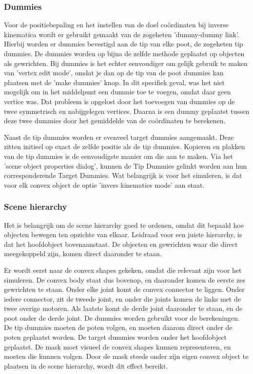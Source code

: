\documentclass[10pt,a4paper]{article}
\begin{document}
\subsubsection{Dummies}
Voor de positiebepaling en het instellen van de doel co\"ordinaten bij inverse kinematica wordt er gebruikt gemaakt van de zogeheten 'dummy-dummy link'. Hierbij worden er dummies bevestigd aan de tip van elke poot, de zogeheten tip dummies. De dummies worden op bijna de zelfde methode geplaatst op objecten als gewrichten. Bij dummies is het echter eenvoudiger om gelijk gebruik te maken van 'vertex edit mode', omdat je dan op de tip van de poot dummies kan plaatsen met de 'make dummies' knop. In dit specifiek geval, was het niet mogelijk om in het middelpunt een dummie toe te voegen, omdat daar geen vertice was. Dat probleem is opgelost door het toevoegen van dummies op de twee symmetrisch en nabijgelegen vertices. Daarna is een dummy geplaatst tussen deze twee dummies door het gemiddelde van de co\"ordinaten te berekenen.

Naast de tip dummies worden er evenveel target dummies aangemaakt. Deze zitten initieel op exact de zelfde positie als de tip dummies. Kopieren en plakken van de tip dummies is de eenvoudigste manier om die aan te maken. Via het 'scene object properties dialog', kunnen de Tip Dummies gelinkt worden aan hun corresponderende Target Dummies. Wat belangrijk is voor het simuleren, is dat voor elk convex object de optie 'invers kinematics mode' aan staat.

\subsubsection{Scene hierarchy}
Het is belangrijk om de scene hierarchy goed te ordenen, omdat dit bepaald hoe objecten bewegen ten opzichte van elkaar. Leidraad voor een juiste hierarchy, is dat het hoofdobject bovenaanstaat. De objecten en gewrichten waar die direct meegekoppeld zijn, komen direct daaronder te staan.


Er wordt eerst naar de convex shapes gekeken, omdat die relevant zijn voor het simuleren. De convex body staat dus bovenop, en daaronder komen de eerste zes gewrichten te staan. Onder elke joint komt de convex connector te liggen. Onder iedere connector, zit de tweede joint, en onder die joints komen de links met de twee overige motoren. Als laatste komt de derde joint daaronder te staan, en de poot onder de derde joint. De dummies worden gebruikt voor de berekeningen. De tip dummies moeten de poten volgen, en moeten daarom direct onder de poten geplaatst worden. De target dummies worden onder het hoofdobject geplaatst.
De mask moet visueel de convex shapes kunnen representeren, en moeten die kunnen volgen. Door de mask steeds onder zijn eigen convex object te plaatsen in de scene hierarchy, wordt dit effect bereikt.
\end{document}
